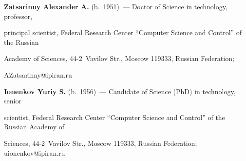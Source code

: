 \noindent

\textbf{Zatsarinny Alexander A.} (b.\ 1951)~--- Doctor of Science in technology, professor, 

principal scientist, Federal Research Center ``Computer Science and Control'' of the Russian 

Academy of Sciences, 44-2~Vavilov Str., Moscow 119333, Russian Federation; 

\mbox{AZatsarinny@ipiran.ru}



\vspace*{3pt}



\noindent

\textbf{Ionenkov Yuriy S.} (b.\ 1956)~--- Candidate of Science (PhD) in technology, senior 

scientist, Federal Research Center ``Computer Science and Control'' of the Russian Academy of 

Sciences, 44-2~Vavilov Str., Moscow 119333, Russian Federation; \mbox{uionenkov@ipiran.ru}

  

\label{end\stat}



\renewcommand{\bibname}{\protect\rm Литература} 

